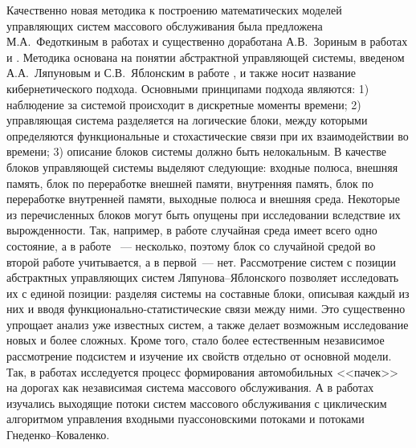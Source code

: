 Качественно новая методика к построению математических моделей управляющих систем массового обслуживания была предложена М.А.~Федоткиным в работах \cite{Fedotkin:1996, fedotkin:1998} и существенно доработана А.В.~Зориным в работах \cite{Zorin:2008:1, Zorin:2014, ZorineDissertation} и \cite{Zorin:2017}. Методика основана на понятии абстрактной управляющей системы, введеном А.А.~Ляпуновым и С.В.~Яблонским в работе \cite{Lyapunov}, и также носит название кибернетического подхода. Основными принципами подхода являются: 1) наблюдение за системой происходит в дискретные моменты времени; 2) управляющая система разделяется на логические блоки, между которыми определяются функциональные и стохастические связи при их взаимодействии во времени; 3) описание блоков системы должно быть нелокальным. В качестве блоков управляющей системы выделяют следующие: входные полюса, внешняя память, блок по переработке внешней памяти, внутренняя память, блок по переработке внутренней памяти, выходные полюса и внешняя среда. Некоторые из перечисленных блоков могут быть опущены при исследовании вследствие их вырожденности. Так, например, в работе \cite{Novgorod:2011} случайная среда имеет всего одно состояние, а в работе \cite{Zorin:2008:1}~--- несколько, поэтому блок со случайной средой во второй работе учитывается, а в первой~--- нет. Рассмотрение систем с позиции абстрактных управляющих систем Ляпунова--Яблонского позволяет исследовать их с единой позиции: разделяя системы на составные блоки, описывая каждый из них и вводя функционально-статистические связи между ними. Это существенно упрощает анализ уже известных систем, а также делает возможным исследование новых и более сложных. Кроме того, стало более естественным независимое рассмотрение подсистем  и изучение их свойств отдельно от основной модели. Так, в работах \cite{FedotkinRachinskaya, Fedotkin:2012} исследуется процесс формирования автомобильных <<пачек>> на дорогах как независимая система массового обслуживания. А в работах \cite{Proidakova:2008,Fedotkin:2009} изучались выходящие потоки систем массового обслуживания с циклическим алгоритмом управления входными пуассоновскими потоками и потоками Гнеденко--Коваленко. 

